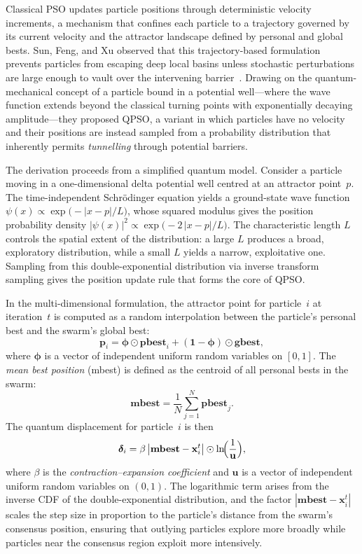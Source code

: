 Classical PSO updates particle positions through deterministic velocity
increments, a mechanism that confines each particle to a trajectory governed by
its current velocity and the attractor landscape defined by personal and global
bests.  Sun, Feng, and Xu observed that this trajectory-based formulation
prevents particles from escaping deep local basins unless stochastic
perturbations are large enough to vault over the intervening
barrier~\cite{Sun2004}.  Drawing on the quantum-mechanical concept of a
particle bound in a potential well---where the wave function extends beyond the
classical turning points with exponentially decaying amplitude---they proposed
QPSO, a variant in which particles have no velocity and their positions are
instead sampled from a probability distribution that inherently permits
\emph{tunnelling} through potential barriers.

The derivation proceeds from a simplified quantum model.  Consider a particle
moving in a one-dimensional delta potential well centred at an attractor
point~$p$.  The time-independent Schr\"odinger equation yields a ground-state
wave function
$\psi(x) \propto \exp\bigl(-|x - p|/L\bigr)$,
whose squared modulus gives the position probability density
$|\psi(x)|^2 \propto \exp\bigl(-2\,|x - p|/L\bigr)$.
The characteristic length $L$ controls the spatial extent of the distribution:
a large $L$ produces a broad, exploratory distribution, while a small $L$
yields a narrow, exploitative one.  Sampling from this double-exponential
distribution via inverse transform sampling gives the position update rule
that forms the core of QPSO.

In the multi-dimensional formulation, the attractor point for particle~$i$ at
iteration~$t$ is computed as a random interpolation between the particle's
personal best and the swarm's global best:
\begin{equation}
  \mathbf{p}_i = \boldsymbol{\phi} \odot \mathbf{pbest}_i
    + (\mathbf{1} - \boldsymbol{\phi}) \odot \mathbf{gbest},
  \label{eq:qpso_attractor}
\end{equation}
where $\boldsymbol{\phi}$ is a vector of independent uniform random variables
on $[0,1]$.  The \emph{mean best position} (mbest) is defined as the centroid
of all personal bests in the swarm:
\begin{equation}
  \mathbf{mbest} = \frac{1}{N} \sum_{j=1}^{N} \mathbf{pbest}_j.
  \label{eq:mbest}
\end{equation}
The quantum displacement for particle~$i$ is then
\begin{equation}
  \boldsymbol{\delta}_i = \beta\,
    \bigl|\mathbf{mbest} - \mathbf{x}_i^{t}\bigr|
    \odot \ln\!\Bigl(\frac{1}{\mathbf{u}}\Bigr),
  \label{eq:qpso_displacement}
\end{equation}
where $\beta$ is the \emph{contraction--expansion coefficient} and
$\mathbf{u}$ is a vector of independent uniform random variables on $(0,1)$.
The logarithmic term arises from the inverse CDF of the double-exponential
distribution, and the factor $|\mathbf{mbest} - \mathbf{x}_i^{t}|$ scales the
step size in proportion to the particle's distance from the swarm's consensus
position, ensuring that outlying particles explore more broadly while
particles near the consensus region exploit more intensively.

